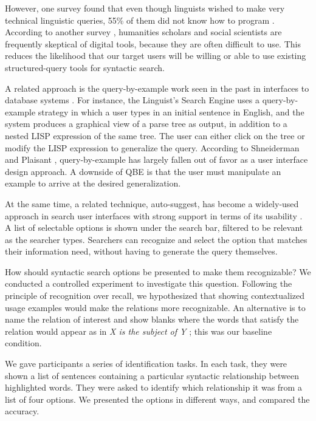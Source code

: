 However, one survey found that even though linguists wished to make very technical  linguistic queries, 55\% of them did not know how to program \cite{soehn2008requirements}. According to another survey \cite{gibbs_building_2012}, humanities scholars and social scientists are frequently skeptical of digital tools, because they are often difficult to use. This reduces the likelihood that our target users will be willing or able to use existing structured-query tools for syntactic search.

A related approach is the query-by-example work seen in the past in interfaces to database systems \cite{androutsopoulos1995natural}. For instance, the Linguist's Search Engine \cite{resnik2005web} uses a query-by-example strategy in which a user types in an initial sentence in English, and the system produces a graphical view of a parse tree as output, in addition to a nested LISP expression of the same tree.  The user can either click on the tree or modify the LISP expression to generalize the query. %
According to Shneiderman and Plaisant \cite{shneiderman2010designing}, query-by-example has largely fallen out of favor as a user interface design approach. A downside of QBE is that the user must manipulate an example to arrive at the desired generalization.

At the same time, a related technique, auto-suggest, has become a widely-used approach in search user interfaces with strong support in terms of its usability \cite{hearst2009search}. A list of selectable options is shown under the search bar, filtered to be relevant as the searcher types. Searchers can recognize and select the option that matches their information need, without having to generate the query themselves.

How should syntactic search options be presented to make them recognizable? We conducted a controlled experiment to investigate this question. Following the principle of recognition over recall, we hypothesized that showing contextualized usage examples would make the relations more recognizable. An alternative is to name the relation of interest and show blanks where the words that satisfy the relation would appear as in \emph{X is the subject of Y} \cite{muralidharan2013supporting}; this was our baseline condition.

We gave participants a series of identification tasks. In each task, they were shown a list of sentences containing a particular syntactic relationship between highlighted words. They were asked to identify which relationship it was from a list of four options. We presented the options in different ways, and compared the accuracy.

